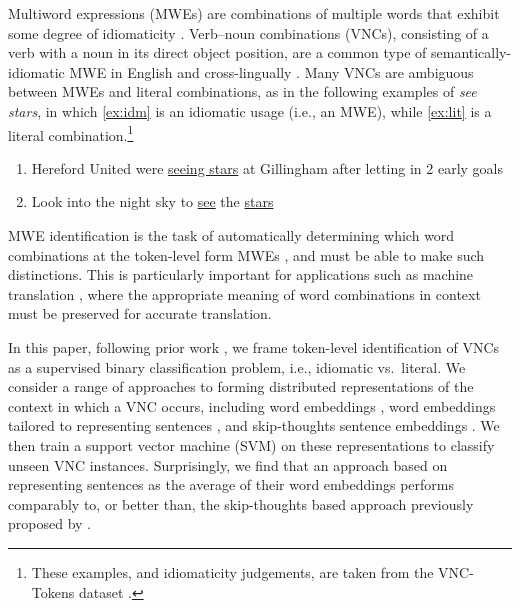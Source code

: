 \documentclass[11pt,a4paper]{article}
\begin{document}

Multiword expressions (MWEs) are combinations of multiple words that
exhibit some degree of idiomaticity
\citep{Baldwin:Kim:2009}. Verb--noun combinations (VNCs), consisting
of a verb with a noun in its direct object position, are a common type
of semantically-idiomatic MWE in English and cross-lingually
\citep{Fazly2009}. Many VNCs are ambiguous between MWEs and literal
combinations, as in the following examples of \emph{see stars}, in
which \ref{ex:idm} is an idiomatic usage (i.e., an MWE), while
\ref{ex:lit} is a literal combination.\footnote{These examples, and
  idiomaticity judgements, are taken from the VNC-Tokens dataset
  \citep{Cook2008}.}

\begin{enumerate}
\item Hereford United were \underline{seeing stars} at Gillingham
  after letting in 2 early goals \label{ex:idm}

\item Look into the night sky to \underline{see} the
  \underline{stars} \label{ex:lit}
\end{enumerate}

\noindent
MWE identification is the task of automatically determining which word
combinations at the token-level form MWEs \citep{Baldwin:Kim:2009},
and must be able to make such distinctions. This is particularly
important for applications such as machine translation
\citep{Sag2002}, where the appropriate meaning of word combinations in
context must be preserved for accurate translation.


In this paper, following prior work
\citep[e.g.,][]{salton-ross-kelleher}, we frame token-level
identification of VNCs as a supervised binary classification problem,
i.e., idiomatic vs.\ literal. We consider a range of approaches to
forming distributed representations of the context in which a VNC
occurs, including word embeddings \citep{mikolov+:2013b}, word
embeddings tailored to representing sentences
\citep{kenter-borisov-derijke}, and skip-thoughts sentence embeddings
\cite{Kiros+:2015}.  We then train a support vector machine (SVM) on
these representations to classify unseen VNC instances. Surprisingly,
we find that an approach based on representing sentences as the
average of their word embeddings performs comparably to, or better
than,
the skip-thoughts based approach previously proposed by
.
\end{document}
